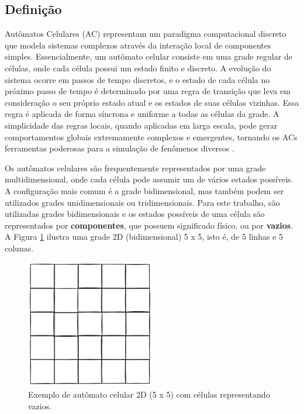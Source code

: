 \documentclass[12pt,oneside]{report}
\begin{document}
\subsection{Definição}

Autômatos Celulares (AC) representam um paradigma computacional discreto que modela sistemas complexos através da interação local de componentes simples. Essencialmente, um autômato celular consiste em uma grade regular de células, onde cada célula possui um estado finito e discreto. A evolução do sistema ocorre em passos de tempo discretos, e o estado de cada célula no próximo passo de tempo é determinado por uma regra de transição que leva em consideração o seu próprio estado atual e os estados de suas células vizinhas. Essa regra é aplicada de forma síncrona e uniforme a todas as células da grade. A simplicidade das regras locais, quando aplicadas em larga escala, pode gerar comportamentos globais extremamente complexos e emergentes, tornando os ACs ferramentas poderosas para a simulação de fenômenos diversos \cite{kier2005}.

Os autômatos celulares são frequentemente representados por uma grade multidimensional, onde cada célula pode assumir um de vários estados possíveis. A configuração mais comum é a grade bidimensional, mas também podem ser utilizados grades unidimensionais ou tridimensionais. Para este trabalho, são utilizadas grades bidimensionais e os estados possíveis de uma célula são representados por \textbf{componentes}, que possuem significado físico, ou por \textbf{vazios}. A Figura \ref{fig:grade_2d} ilustra uma grade 2D (bidimensional) 5 x 5, isto é, de 5 linhas e 5 colunas.

\begin{figure}[H]
    \centering
    \includegraphics[width=0.5\textwidth]{img/grade_2d.png}
    \caption{\small Exemplo de autômato celular 2D (5 x 5) com células representando vazios.}
    \label{fig:grade_2d}
\end{figure}
\end{document}
